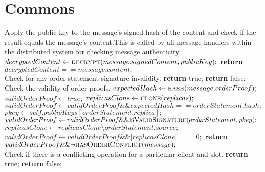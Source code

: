 \section{Commons}
\begin{algorithmic}[1]
 \Comment Apply the public key to the message's signed hash of the content and check if the result equals the message's content.This is called by all message handlers within the distributed system for checking message authenticity.
	\State $decryptedContent\gets \Call{decrypt}{message.signedContent, publicKey};$
	\State \textbf{return} $decryptedContent == message.content;$
\EndFunction
\\

 \Comment Check for any order statement signature invalidity.
    		\State \textbf{return} true;
    	\EndIf
    \EndFor
	\State \textbf{return} false;
\EndFunction
\\

 \Comment Check the validity of order proofs.
	\State $expectedHash \gets \Call{hash}{message.orderProof};$
    \State $validOrderProof \gets true;$
    \State $replicasClone \gets \Call{clone}{replicas};$
        \State $validOrderProof \gets validOrderProof \&\& expectedHash == orderStatement.hash;$
        \State $pkey \gets self.publicKeys[orderStatement.replica];$
        \State $validOrderProof \gets validOrderProof \&\& \Call{isValidSignature}{orderStatement, pkey};$
        \State $replicasClone \gets replicasClone \setminus orderStatement.source;$
    \EndFor
    \State $validOrderProof \gets validOrderProof \&\& |replicasClone| == 0;$
    \State \textbf{return} $validOrderProof \&\& \neg \Call{hasOrderConflict}{message};$
\EndFunction
\\

 \Comment Check if there is a conflicting operation for a particular client and slot.
            \State \textbf{return} true;
        \EndIf
    \EndFor
    \State \textbf{return} false;
\EndFunction
\\


\end{algorithmic}
